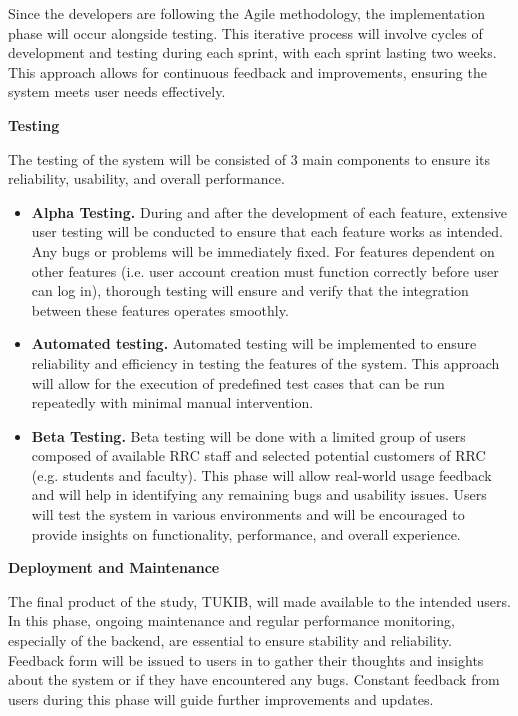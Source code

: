 Since the developers are following the Agile methodology, the implementation phase will occur alongside testing. This iterative process will involve cycles of development and testing during each sprint, with each sprint lasting two weeks. This approach allows for continuous feedback and improvements, ensuring the system meets user needs effectively.\newline
	
\noindent\textbf{Testing}

The testing of the system will be consisted of 3 main components to ensure its reliability, usability, and overall performance.

\begin{itemize}
	\item \textbf{Alpha Testing.} During and after the development of each feature, extensive user testing will be conducted to ensure that each feature works as intended. Any bugs or problems will be immediately fixed. For features dependent on other features (i.e. user account creation must function correctly before user can log in), thorough testing will ensure and verify that the integration between these features operates smoothly.
	
	\item \textbf{Automated testing.} Automated testing will be implemented to ensure reliability and efficiency in testing the features of the system. This approach will allow for the execution of predefined test cases that can be run repeatedly with minimal manual intervention.
	
	\item \textbf{Beta Testing.}  Beta testing will be done with a limited group of users composed of available RRC staff and selected potential customers of RRC (e.g. students and faculty). This phase will allow real-world usage feedback and will help in identifying any remaining bugs and usability issues. Users will test the system in various environments and will be encouraged to provide insights on functionality, performance, and overall experience.\newline
\end{itemize}
	
\noindent\textbf{Deployment and Maintenance}

The final product of the study, TUKIB, will made available to the intended users. In this phase, ongoing maintenance and regular performance monitoring, especially of the backend, are essential to ensure stability and reliability. Feedback form will be issued to users in to gather their thoughts and insights about the system or if they have encountered any bugs. Constant feedback from users during this phase will guide further improvements and updates.

